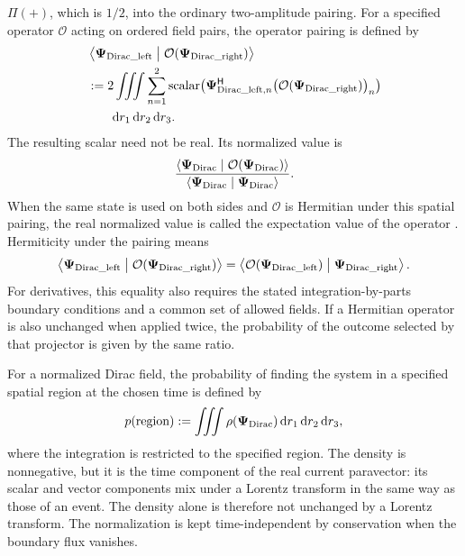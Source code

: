\documentclass[10pt,letterpaper]{article}
\let\STAamsmathtext\text
\newcommand{\eqtext}[1]{\STAamsmathtext{\normalfont\rmfamily #1}}
\newcommand{\eqfunc}[1]{\operatorname{#1}}
\renewcommand{\text}[1]{\STAamsmathtext{\normalfont\rmfamily #1}}
\newcommand{\pv}[1]{#1}
\newcommand{\bPsi}{\pv{\bm{\Psi}}}
\newcommand{\Hop}{\mathsf H}
\newcommand{\herm}[1]{#1^{\Hop}}
\newcommand{\dd}{\mathrm d}
\begin{document}
\(\pv{\Pi}(+)\), which is \(1/2\), into the ordinary
two-amplitude pairing. For a specified operator \(\mathcal{O}\) acting on
ordered field pairs, the operator pairing is defined by
\begin{equation}
\begin{aligned}
&\left\langle
\bPsi_{\eqtext{Dirac\_left}}
\mathrel{\big|}
\mathcal{O}(\bPsi_{\eqtext{Dirac\_right}})
\right\rangle\\
&:=2\iiint\sum_{n=1}^{2}
\eqfunc{scalar}\!\left(
\herm{\bPsi_{\eqtext{Dirac\_left},n}}
\bigl(\mathcal{O}(\bPsi_{\eqtext{Dirac\_right}})\bigr)_n
\right)\\
&\qquad\dd r_1\,\dd r_2\,\dd r_3.
\end{aligned}
\label{eq:dirac-operator-pairing}
\end{equation}
The resulting scalar need not be real. Its normalized value is
\begin{equation}
\frac{
\langle\bPsi_{\eqtext{Dirac}}\mid
\mathcal{O}(\bPsi_{\eqtext{Dirac}})\rangle
}{
\langle\bPsi_{\eqtext{Dirac}}\mid\bPsi_{\eqtext{Dirac}}\rangle
}.
\label{eq:dirac-expectation}
\end{equation}
When the same state is used on both sides and
\(\mathcal{O}\) is Hermitian under this spatial pairing, the real
normalized value is called the expectation value of the operator
\cite{sakurai2017}. Hermiticity under the pairing means
\begin{equation}
\left\langle
\bPsi_{\eqtext{Dirac\_left}}
\mathrel{\big|}
\mathcal{O}(\bPsi_{\eqtext{Dirac\_right}})
\right\rangle
=
\left\langle
\mathcal{O}(\bPsi_{\eqtext{Dirac\_left}})
\mathrel{\big|}
\bPsi_{\eqtext{Dirac\_right}}
\right\rangle.
\label{eq:dirac-pairing-hermitian}
\end{equation}
For derivatives, this equality also requires the stated
integration-by-parts boundary conditions and a common set of allowed fields.
If a Hermitian operator is also unchanged when applied twice, the probability
of the outcome selected by that projector is given by the same ratio.

For a normalized Dirac field, the probability of finding the system in a
specified spatial region at the chosen time is defined by
\begin{equation}
p(\eqtext{region})
:=\iiint\rho(\bPsi_{\eqtext{Dirac}})\,
\dd r_1\,\dd r_2\,\dd r_3,
\label{eq:region-probability}
\end{equation}
where the integration is restricted to the specified region.
The density is nonnegative, but it is the time component of the real current
paravector: its scalar and vector components mix under a Lorentz transform in
the same way as those of an event. The density alone is therefore not
unchanged by a Lorentz transform. The normalization is kept time-independent
by conservation when the boundary flux vanishes.
\end{document}
